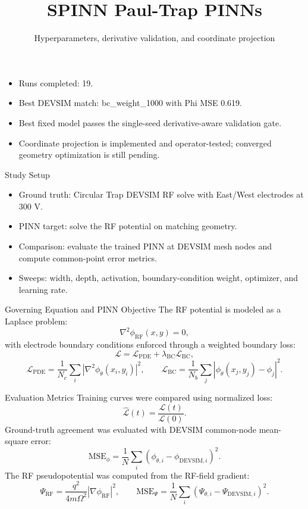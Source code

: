 \documentclass[aspectratio=169,professionalfonts]{beamer}
\title{SPINN Paul-Trap PINNs}
\subtitle{Hyperparameters, derivative validation, and coordinate projection}
\author{}
\date{}
\begin{document}
\begin{frame}[plain]
\titlepage
\vspace{-0.35in}
\begin{itemize}
  \item Runs completed: 19.
  \item Best DEVSIM match: bc\_weight\_1000 with Phi MSE 0.619.
  \item Best fixed model passes the single-seed derivative-aware validation gate.
  \item Coordinate projection is implemented and operator-tested; converged geometry optimization is still pending.
\end{itemize}
\end{frame}

\begin{frame}[t]{Study Setup}
\begin{itemize}
  \item Ground truth: Circular Trap DEVSIM RF solve with East/West electrodes at 300 V.
  \item PINN target: solve the RF potential on matching geometry.
  \item Comparison: evaluate the trained PINN at DEVSIM mesh nodes and compute common-point error metrics.
  \item Sweeps: width, depth, activation, boundary-condition weight, optimizer, and learning rate.
\end{itemize}
\end{frame}

\begin{frame}[t]{Governing Equation and PINN Objective}
The RF potential is modeled as a Laplace problem:
\[
\nabla^2 \phi_{\mathrm{RF}}(x,y) = 0,
\]
with electrode boundary conditions enforced through a weighted boundary loss:
\[
\mathcal{L} = \mathcal{L}_{\mathrm{PDE}} + \lambda_{\mathrm{BC}}\mathcal{L}_{\mathrm{BC}},
\]
\[
\mathcal{L}_{\mathrm{PDE}} = \frac{1}{N_c}\sum_i \left|\nabla^2 \phi_\theta(x_i,y_i)\right|^2,
\qquad
\mathcal{L}_{\mathrm{BC}} = \frac{1}{N_b}\sum_j \left|\phi_\theta(x_j,y_j)-\phi_j\right|^2.
\]
\end{frame}

\begin{frame}[t]{Evaluation Metrics}
Training curves were compared using normalized loss:
\[
\widehat{\mathcal{L}}(t) = \frac{\mathcal{L}(t)}{\mathcal{L}(0)}.
\]
Ground-truth agreement was evaluated with DEVSIM common-node mean-square error:
\[
\mathrm{MSE}_{\phi} = \frac{1}{N}\sum_i \left(\phi_{\theta,i}-\phi_{\mathrm{DEVSIM},i}\right)^2.
\]
The RF pseudopotential was computed from the RF-field gradient:
\[
\Psi_{\mathrm{RF}} = \frac{q^2}{4m\Omega^2}\left|\nabla \phi_{\mathrm{RF}}\right|^2,
\qquad
\mathrm{MSE}_{\Psi} = \frac{1}{N}\sum_i \left(\Psi_{\theta,i}-\Psi_{\mathrm{DEVSIM},i}\right)^2.
\]
\end{frame}
\end{document}
